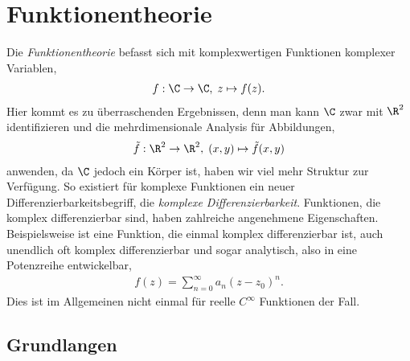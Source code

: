 \section{Funktionentheorie}

Die \emph{Funktionentheorie} befasst sich mit komplexwertigen Funktionen
komplexer Variablen,
\begin{align*}
f: \C\to\C,\; z\mapsto f(z).
\end{align*}
Hier kommt es zu überraschenden Ergebnissen, denn man kann
$\C$ zwar mit $\R^2$ identifizieren und die mehrdimensionale Analysis für
Abbildungen,
\begin{align*}
\tilde{f}: \R^2\to\R^2,\; (x,y)\mapsto \tilde{f}(x,y)
\end{align*}
anwenden, da $\C$ jedoch ein Körper ist, haben wir viel mehr
Struktur zur Verfügung. So existiert für komplexe Funktionen ein
neuer Differenzierbarkeitsbegriff, die \emph{komplexe Differenzierbarkeit}.
Funktionen, die komplex differenzierbar sind, haben zahlreiche 
angenehmene Eigenschaften. Beispielsweise ist eine Funktion, die einmal komplex
differenzierbar ist, auch unendlich oft komplex differenzierbar und sogar
analytisch, also in eine Potenzreihe entwickelbar,
\begin{align*}
f(z) = \sum\limits_{n=0}^\infty a_n (z-z_0)^n.
\end{align*}
Dies ist im Allgemeinen nicht einmal für reelle $C^\infty$ Funktionen der Fall.

\subsection{Grundlangen}

